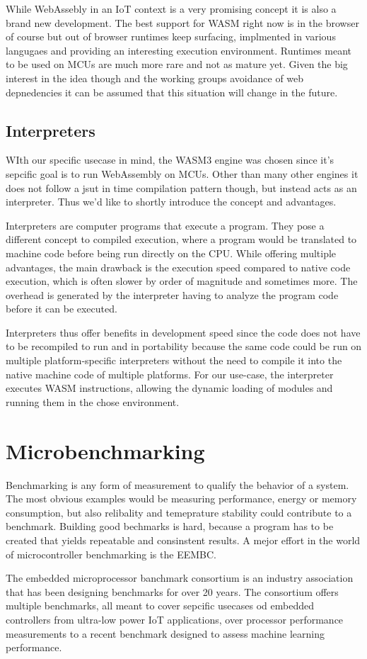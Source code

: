 While WebAssebly in an IoT context is a very promising concept it is also a brand new development. The best support for WASM right now is in the browser of course but out of browser runtimes keep surfacing, implmented in various langugaes and providing an interesting execution environment. Runtimes meant to be used on MCUs are much more rare and not as mature yet. Given the big interest in the idea though and the working groups avoidance of web depnedencies it can be assumed that this situation will change in the future.
\subsection{Interpreters}
WIth our specific usecase in mind, the WASM3 engine was chosen since it's sepcific goal is to run WebAssembly on MCUs. Other than many other engines it does not follow a jsut in time compilation pattern though, but instead acts as an interpreter. Thus we'd like to shortly introduce the concept and advantages.

Interpreters are computer programs that execute a program. They pose a different concept to compiled execution, where a program would be translated to machine code before being run directly on the CPU. While offering multiple advantages, the main drawback is the execution speed compared to native code execution, which is often slower by order of magnitude and sometimes more. The overhead is generated by the interpreter having to analyze the program code before it can be executed.

Interpreters thus offer benefits in development speed since the code does not have to be recompiled to run and in portability because the same code could be run on multiple platform-specific interpreters without the need to compile it into the native machine code of multiple platforms. For our use-case, the interpreter executes WASM instructions, allowing the dynamic loading of modules and running them in the chose environment.
\section{Microbenchmarking}
Benchmarking is any form of measurement to qualify the behavior of a system. The most obvious examples would be measuring performance, energy or memory consumption, but also relibality and temeprature stability could contribute to a benchmark. Building good bechmarks is hard, because a program has to be created that yields repeatable and consinstent results. A mejor effort in the world of microcontroller benchmarking is the EEMBC.

The embedded microprocessor banchmark consortium is an industry association that has been designing benchmarks for over 20 years. The consortium offers multiple benchmarks, all meant to cover sepcific usecases od embedded controllers from ultra-low power IoT applications, over processor performance measurements to a recent benchmark designed to assess machine learning performance.